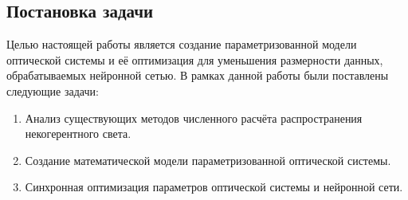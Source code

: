 \subsection{Постановка задачи}
Целью настоящей работы является создание параметризованной модели оптической системы и её оптимизация для уменьшения размерности данных, обрабатываемых нейронной сетью. В рамках данной работы были поставлены следующие задачи:
\begin{enumerate}
	\item
	Анализ существующих методов численного расчёта распространения некогерентного света.
	
	\item
	Создание математической модели параметризованной оптической системы.
	
	\item
	Синхронная оптимизация параметров оптической системы и нейронной сети.
\end{enumerate}
